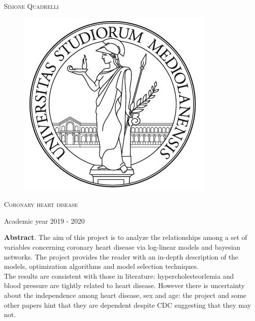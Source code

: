 \documentclass{article}
\begin{document}
\begin{titlepage}
	
	
	\begin{center}
		\vspace{2 cm}
		{\Large \textsc{Simone Quadrelli} }
	\end{center}
	
	
	\begin{figure}[H]
		\vspace{2 cm}
		\centering
		\includegraphics[width=0.30\linewidth]{tesiSCIENZE_TECNOLOGIE.jpg}
		
	\end{figure}
	
	\begin{center}
		\vspace{2 cm}
		{\Large \textsc{Coronary heart disease} }
	\end{center}

	\par
	\vspace{3 cm}
	
	\begin{center}
		{\large Academic year 2019 - 2020}
	\end{center}
\end{titlepage}



\newpage 
{}
\tableofcontents
\listoffigures
\newpage

\textbf{Abstract}. The aim of this project is to analyze the relationships among a set of variables concerning coronary heart disease via log-linear models and bayesian networks. The project provides the reader with an in-depth description of the models, optimization algorithms and model selection techniques. \\
The results are consistent with those in literature: hypercholesteorlemia and blood pressure are tightly related to heart disease. However there is uncertainty about the independence among heart disease, sex and age: the project and some other papers hint that they are dependent despite CDC suggesting that they may not. 
\end{document}
